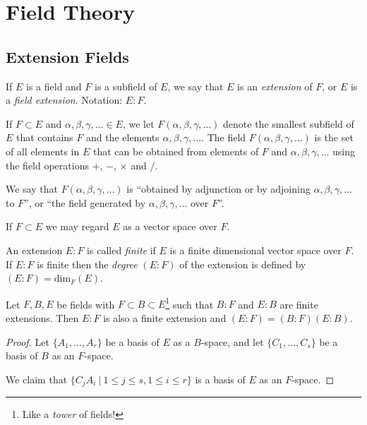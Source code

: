 \section{Field Theory}
\subsection{Extension Fields}
\begin{definition}
	If $E$ is a field and $F$ is a subfield of $E$, we say that $E$ is an \emph{extension} of $F$, or $E$ is a \emph{field extension}. Notation: $E:F$.
\end{definition}

If $F \subset E$ and $\alpha, \beta, \gamma, \ldots \in E$, we let $F(\alpha, \beta, \gamma, \ldots)$ denote the smallest subfield of $E$ that contains $F$ and the elements $\alpha, \beta, \gamma, \ldots$. The field $F(\alpha, \beta, \gamma, \ldots)$ is the set of all elements in $E$ that can be obtained from elements of $F$ and $\alpha, \beta, \gamma, \ldots$ using the field operations $+$, $-$, $\times$ and $/$.

We say that $F(\alpha, \beta, \gamma, \ldots)$ is ``obtained by adjunction or by adjoining $\alpha, \beta, \gamma, \ldots$ to $F$'', or ``the field generated by $\alpha, \beta, \gamma, \ldots$ over $F$''.

If $F \subset E$ we may regard $E$ as a vector space over $F$.

\begin{definition}
	An extension $E:F$ is called \emph{finite} if $E$ is a finite dimensional vector space over $F$. If $E:F$ is finite then the \emph{degree} $(E:F)$ of the extension is defined by $(E:F) = \text{dim}_F(E)$.
\end{definition}

\begin{theorem}
	Let $F, B, E$ be fields with $F \subset B \subset E$\footnote{Like a \emph{tower} of fields!} such that $B:F$ and $E:B$ are finite extensions. Then $E:F$ is also a finite extension and $(E:F) = (B:F)(E:B)$.
	\begin{proof}
		Let $\{A_1, \ldots, A_r\}$ be a basis of $E$ as a $B$-space, and let $\{C_1, \ldots, C_s\}$ be a basis of $B$ as an $F$-space.
		
		We claim that $\{C_j A_i\ |\ 1 \leq j \leq s, 1 \leq i \leq r\}$ is a basis of $E$ as an $F$-space.
	\end{proof}
\end{theorem}
